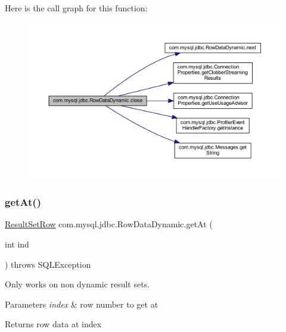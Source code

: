 Here is the call graph for this function\+:
\nopagebreak
\begin{figure}[H]
\begin{center}
\leavevmode
\includegraphics[width=350pt]{classcom_1_1mysql_1_1jdbc_1_1_row_data_dynamic_a284d8e7db5b779d4c20de17f1f5b8c5c_cgraph}
\end{center}
\end{figure}
\mbox{\label{classcom_1_1mysql_1_1jdbc_1_1_row_data_dynamic_a8d011f77f4119fb0bb18623bc874ae3e}} 
\subsubsection{\texorpdfstring{get\+At()}{getAt()}}
{\footnotesize\ttfamily \mbox{\hyperlink{classcom_1_1mysql_1_1jdbc_1_1_result_set_row}{Result\+Set\+Row}} com.\+mysql.\+jdbc.\+Row\+Data\+Dynamic.\+get\+At (\begin{DoxyParamCaption}\item[{int}]{ind }\end{DoxyParamCaption}) throws S\+Q\+L\+Exception}

Only works on non dynamic result sets.


\begin{DoxyParams}{Parameters}
{\em index} & row number to get at \\
\hline
\end{DoxyParams}
\begin{DoxyReturn}{Returns}
row data at index 
\end{DoxyReturn}

